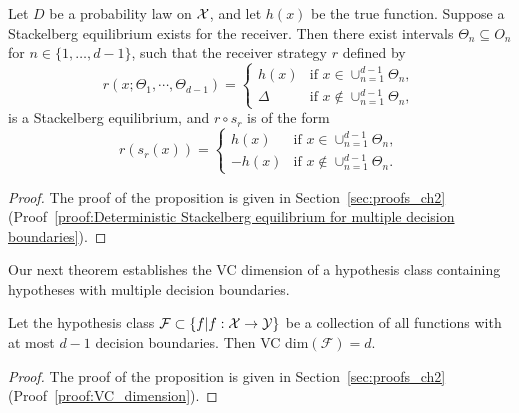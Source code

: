 \begin{prop}\label{prop:Deterministic Stackelberg equilibrium for multiple decision boundaries}
	Let $D$ be a probability law on $\mathcal{X}$, and let $h(x)$ be the true function. Suppose a Stackelberg equilibrium exists for the receiver. Then there exist intervals $\Theta_n \subseteq O_n$ for $n \in \{1, \dots, d-1\}$, such that the receiver strategy $r$ defined by
	\begin{equation}\label{eqn:stack multiple}
		r(x;\Theta_1,\cdots,\Theta_{d-1}) = \begin{cases}
			h(x) & \text{if } x \in \cup_{n=1}^{d-1} \Theta_n, \\
			\Delta & \text{if } x \not\in \cup_{n=1}^{d-1} \Theta_n,
		\end{cases}
	\end{equation}
	is a Stackelberg equilibrium, and $r \circ s_r$ is of the form
	\begin{equation*}
		r(s_r(x)) = \begin{cases}
			h(x) & \text{if } x \in \cup_{n=1}^{d-1} \Theta_n, \\
			-h(x) & \text{if } x \not\in \cup_{n=1}^{d-1} \Theta_n.
		\end{cases}
	\end{equation*}
\end{prop}


\begin{proof} The proof of the proposition is given in Section~\ref{sec:proofs_ch2} (Proof~\ref{proof:Deterministic Stackelberg equilibrium for multiple decision boundaries}).
\end{proof}

Our next theorem establishes the VC dimension of a hypothesis class containing hypotheses with multiple decision boundaries.

\begin{prop}\label{prop: VC dimension}
    Let the hypothesis class $\mathcal{F} \subset \{f| f:\mathcal{X} \rightarrow \mathcal{Y}\}$ be a collection of all functions with at most $d-1$ decision boundaries. Then VC dim$(\mathcal{F}) = d$.
\end{prop}

\begin{proof} The proof of the proposition is given in Section~\ref{sec:proofs_ch2} (Proof~\ref{proof:VC_dimension}).
\end{proof}
